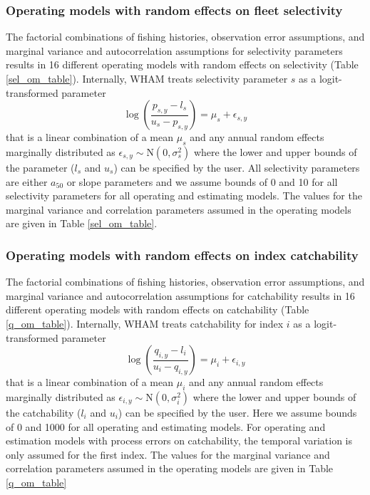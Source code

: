 \documentclass[
  12pt,
]{article}
\begin{document}
\hypertarget{operating-models-with-random-effects-on-fleet-selectivity}{%
\subsubsection*{Operating models with random effects on fleet
selectivity}\label{operating-models-with-random-effects-on-fleet-selectivity}}

The factorial combinations of fishing histories, observation error
assumptions, and marginal variance and autocorrelation assumptions for
selectivity parameters results in 16 different operating models with
random effects on selectivity (Table \ref{sel_om_table}). Internally,
WHAM treats selectivity parameter \(s\) as a logit-transformed parameter
\[
\log\left(\frac{p_{s,y}-l_{s}}{u_{s}-p_{s,y}}\right) = \mu_s + \epsilon_{s,y}
\] that is a linear combination of a mean \(\mu_s\) and any annual
random effects marginally distributed as
\(\epsilon_{s,y} \sim \text{N}\left(0,\sigma_s^2\right)\) where the
lower and upper bounds of the parameter (\(l_s\) and \(u_s\)) can be
specified by the user. All selectivity parameters are either \(a_50\) or
slope parameters and we assume bounds of 0 and 10 for all selectivity
parameters for all operating and estimating models. The values for the
marginal variance and correlation parameters assumed in the operating
models are given in Table \ref{sel_om_table}.

\hypertarget{operating-models-with-random-effects-on-index-catchability}{%
\subsubsection*{Operating models with random effects on index
catchability}\label{operating-models-with-random-effects-on-index-catchability}}

The factorial combinations of fishing histories, observation error
assumptions, and marginal variance and autocorrelation assumptions for
catchability results in 16 different operating models with random
effects on catchability (Table \ref{q_om_table}). Internally, WHAM
treats catchability for index \(i\) as a logit-transformed parameter \[
\log\left(\frac{q_{i,y}-l_{i}}{u_{i}-q_{i,y}}\right) = \mu_i + \epsilon_{i,y}
\] that is a linear combination of a mean \(\mu_i\) and any annual
random effects marginally distributed as
\(\epsilon_{i,y} \sim \text{N}\left(0,\sigma_i^2\right)\) where the
lower and upper bounds of the catchability (\(l_i\) and \(u_i\)) can be
specified by the user. Here we assume bounds of 0 and 1000 for all
operating and estimating models. For operating and estimation models
with process errors on catchability, the temporal variation is only
assumed for the first index. The values for the marginal variance and
correlation parameters assumed in the operating models are given in
Table \ref{q_om_table}
\end{document}
